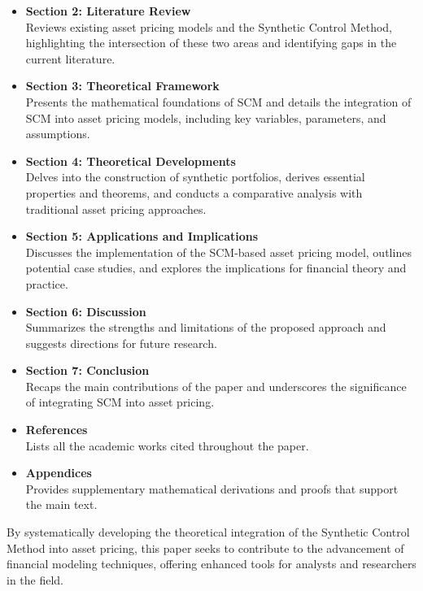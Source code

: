 \begin{itemize}
    \item \textbf{Section 2: Literature Review} \\
    Reviews existing asset pricing models and the Synthetic Control Method, highlighting the intersection of these two areas and identifying gaps in the current literature.
    
    \item \textbf{Section 3: Theoretical Framework} \\
    Presents the mathematical foundations of SCM and details the integration of SCM into asset pricing models, including key variables, parameters, and assumptions.
    
    \item \textbf{Section 4: Theoretical Developments} \\
    Delves into the construction of synthetic portfolios, derives essential properties and theorems, and conducts a comparative analysis with traditional asset pricing approaches.
    
    \item \textbf{Section 5: Applications and Implications} \\
    Discusses the implementation of the SCM-based asset pricing model, outlines potential case studies, and explores the implications for financial theory and practice.
    
    \item \textbf{Section 6: Discussion} \\
    Summarizes the strengths and limitations of the proposed approach and suggests directions for future research.
    
    \item \textbf{Section 7: Conclusion} \\
    Recaps the main contributions of the paper and underscores the significance of integrating SCM into asset pricing.
    
    \item \textbf{References} \\
    Lists all the academic works cited throughout the paper.
    
    \item \textbf{Appendices} \\
    Provides supplementary mathematical derivations and proofs that support the main text.
\end{itemize}

By systematically developing the theoretical integration of the Synthetic Control Method into asset pricing, this paper seeks to contribute to the advancement of financial modeling techniques, offering enhanced tools for analysts and researchers in the field.











